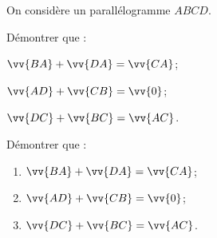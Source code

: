 \documentclass[11pt,a4paper]{article}
\begin{document}
On considère un parallélogramme $ABCD$.

Démontrer que :

\begin{inparaenum}
	\item $\vv{BA}+\vv{DA}=\vv{CA}$;\hfill
	\item $\vv{AD}+\vv{CB}=\vv{0}$;\hfill
	\item $\vv{DC}+\vv{BC}=\vv{AC}$.
\end{inparaenum}

Démontrer que :

\begin{multicols}{3}
	\begin{enumerate}
		\item $\vv{BA}+\vv{DA}=\vv{CA}$;
		\item $\vv{AD}+\vv{CB}=\vv{0}$;
		\item $\vv{DC}+\vv{BC}=\vv{AC}$.
	\end{enumerate}
\end{multicols}
\end{document}
